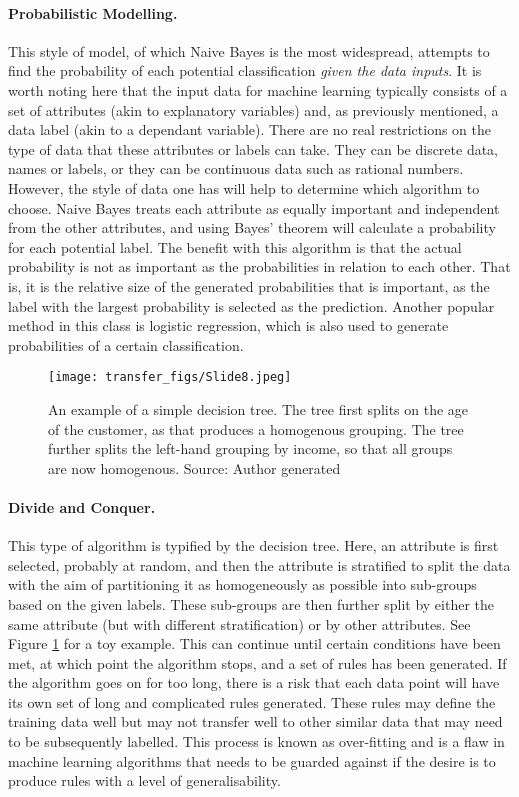 \paragraph{Probabilistic Modelling.} This style of model, of which Naive Bayes is the most widespread, attempts to find the probability of each potential classification \emph{given the data inputs}. It is worth noting here that the input data for machine learning typically consists of a set of attributes (akin to explanatory variables) and, as previously mentioned, a data label (akin to a dependant variable). There are no real restrictions on the type of data that these attributes or labels can take. They can be discrete data, names or labels, or they can be continuous data such as rational numbers. However, the style of data one has will help to determine which algorithm to choose. Naive Bayes treats each attribute as equally important and independent from the other attributes, and using Bayes’ theorem will calculate a probability for each potential label. The benefit with this algorithm is that the actual probability is not as important as the probabilities in relation to each other. That is, it is the relative size of the generated probabilities that is important, as the label with the largest probability is selected as the prediction. Another popular method in this class is logistic regression, which is also used to generate probabilities of a certain classification.

\begin{figure}
  \texttt{[image: transfer\_figs/Slide8.jpeg]}
  \caption[Decision tree example.]{An example of a simple decision tree. The tree first splits on the age of the customer, as that produces a homogenous grouping. The tree further splits the left-hand grouping by income, so that all groups are now homogenous.  Source: Author generated }
  \label{fig:tree}
\end{figure}

\paragraph{Divide and Conquer.} This type of algorithm is typified by the decision tree. Here, an attribute is first selected, probably at random, and then the attribute is stratified to split the data with the aim of partitioning it as homogeneously as possible into sub-groups based on the given labels. These sub-groups are then further split by either the same attribute (but with different stratification) or by other attributes. See Figure \ref{fig:tree} for a toy example. This can continue until certain conditions have been met, at which point the algorithm stops, and a set of rules has been generated. If the algorithm goes on for too long, there is a risk that each data point will have its own set of long and complicated rules generated. These rules may define the training data well but may not transfer well to other similar data that may need to be subsequently labelled. This process is known as over-fitting and is a flaw in machine learning algorithms that needs to be guarded against if the desire is to produce rules with a level of generalisability.

